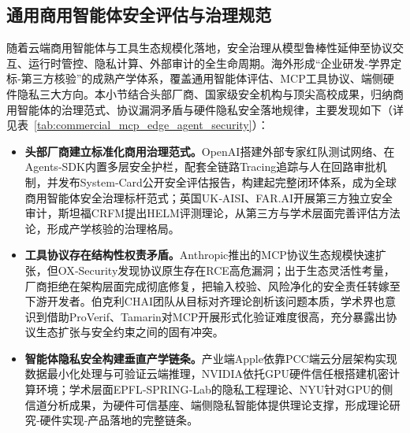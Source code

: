 \subsection{通用商用智能体安全评估与治理规范}
随着云端商用智能体与工具生态规模化落地，安全治理从模型鲁棒性延伸至协议交互、运行时管控、隐私计算、外部审计的全生命周期。海外形成“企业研发‑学界定标‑第三方核验”的成熟产学体系，覆盖通用智能体评估、MCP工具协议、端侧硬件隐私三大方向\cite{openaiRedTeamNetwork2025,mcpFormalFramework2026,nvidiaConfidentialComputingProduct2026}。本小节结合头部厂商、国家级安全机构与顶尖高校成果，归纳商用智能体的治理范式、协议漏洞矛盾与硬件隐私安全落地规律，主要发现如下（详见表~\ref{tab:commercial_mcp_edge_agent_security}）：
\begin{itemize}[tabitem]
    \item \textbf{头部厂商建立标准化商用治理范式。}OpenAI搭建外部专家红队测试网络、在Agents‑SDK内置多层安全护栏，配套全链路Tracing追踪与人在回路审批机制，并发布System‑Card公开安全评估报告，构建起完整闭环体系，成为全球商用智能体安全治理标杆范式\cite{openaiChatGPTAgentSystemCard2025,openaiAgentsSDK2025,openaiGuardrailsApprovalsDoc2026}；英国UK‑AISI、FAR.AI开展第三方独立安全审计，斯坦福CRFM提出HELM评测理论，从第三方与学术层面完善评估方法论，形成产学核验的治理格局\cite{venturebeatChatGPTAgent2025}。

    \item \textbf{工具协议存在结构性权责矛盾。}Anthropic推出的MCP协议生态规模快速扩张，但OX‑Security发现协议原生存在RCE高危漏洞；出于生态灵活性考量，厂商拒绝在架构层面完成彻底修复，把输入校验、风险净化的安全责任转嫁至下游开发者。伯克利CHAI团队从目标对齐理论剖析该问题本质，学术界也意识到借助ProVerif、Tamarin对MCP开展形式化验证难度很高，充分暴露出协议生态扩张与安全约束之间的固有冲突\cite{oxSecurityMCP2026,berkeleyCHAI2026,mcpFormalFramework2026}。

    \item \textbf{智能体隐私安全构建垂直产学链条。}产业端Apple依靠PCC端云分层架构实现数据最小化处理与可验证云端推理，NVIDIA依托GPU硬件信任根搭建机密计算环境；学术层面EPFL‑SPRING‑Lab的隐私工程理论、NYU针对GPU的侧信道分析成果，为硬件可信基座、端侧隐私智能体提供理论支撑，形成理论研究‑硬件实现‑产品落地的完整链条\cite{springLab2026,karriNYU2026}。
\end{itemize}


\begingroup

